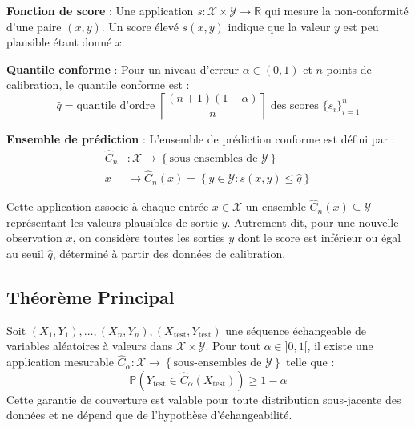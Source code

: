 \documentclass[a4paper,12pt]{article}
\begin{document}
\textbf{Fonction de score} : Une application $s : \mathcal{X} \times \mathcal{Y} \rightarrow \mathbb{R}$ qui mesure la non-conformité d'une paire $(x, y)$. Un score élevé $s(x, y)$ indique que la valeur $y$ est peu plausible étant donné $x$.

\textbf{Quantile conforme} : Pour un niveau d'erreur $\alpha \in (0,1)$ et $n$ points de calibration, le quantile conforme est :
$$\hat{q} = \text{quantile d'ordre } \left\lceil \frac{(n+1)(1 - \alpha)}{n} \right\rceil \text{ des scores } \{s_i\}_{i=1}^n$$

\textbf{Ensemble de prédiction} : L'ensemble de prédiction conforme est défini par :
\[
\begin{aligned}
\hat{C}_n &: \mathcal{X} \rightarrow \left\{ \text{sous-ensembles de } \mathcal{Y} \right\} \\
   x &\mapsto \hat{C}_n(x) = \left\{ y \in \mathcal{Y} : s(x, y) \leq \hat{q} \right\}
\end{aligned}
\]

    Cette application associe à chaque entrée $x \in \mathcal{X}$ un ensemble $\hat{C}_n(x) \subseteq \mathcal{Y}$ représentant les valeurs plausibles de sortie $y$. 
    Autrement dit, pour une nouvelle observation $x$, on considère toutes les sorties $y$ dont le score est inférieur ou égal au seuil $\hat{q}$, déterminé à partir des données de calibration. 



\subsection{Théorème Principal}


\begin{theorem}
Soit $(X_1, Y_1), \ldots, (X_n, Y_n), (X_{\text{test}}, Y_{\text{test}})$ une séquence échangeable de variables aléatoires à valeurs dans $\mathcal{X} \times \mathcal{Y}$. Pour tout $\alpha \in ]0,1[$, il existe une application mesurable $\hat{C}_\alpha : \mathcal{X} \to \left\{ \text{sous-ensembles de } \mathcal{Y} \right\}$ telle que :
\begin{equation}
\mathbb{P}\left(Y_{\text{test}} \in \hat{C}_\alpha(X_{\text{test}})\right) \geq 1 - \alpha
\end{equation}
Cette garantie de couverture est valable pour toute distribution sous-jacente des données et ne dépend que de l'hypothèse d'échangeabilité.
\end{theorem}
\end{document}
